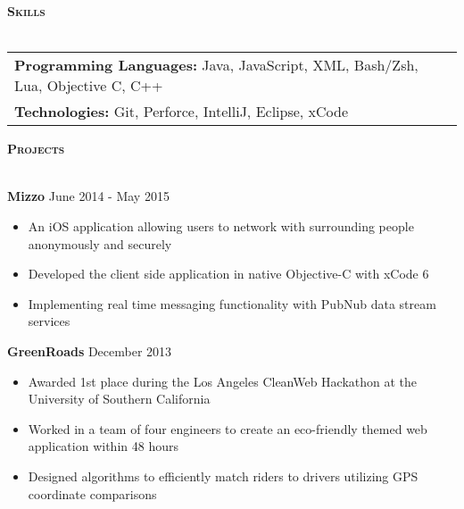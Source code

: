 \documentclass{article}
\newcommand{\lineunder} {
    \vspace*{-8pt} \\
    \hspace*{-18pt} \hrulefill \\
}
\newcommand{\header} [1] {
    {\hspace*{-18pt}\vspace*{6pt} \large{\textbf{\textsc{#1}}}}
    \vspace*{-6pt} \lineunder
}
\begin{document}
\vspace*{2mm}

\header{Skills}
\vspace{1mm}

\begin{tabular}{ l l }
	\textbf{Programming Languages:} Java, JavaScript, XML, Bash/Zsh, Lua, Objective C, C++ \\
	\textbf{Technologies:} Git, Perforce, IntelliJ, Eclipse, xCode \\
\end{tabular}

\vspace*{2mm}

\header{Projects}
\vspace{1mm}

{\textbf{Mizzo} \hfill June 2014 - May 2015}
\begin{itemize} \itemsep -1pt
	\item An iOS application allowing users to network with surrounding people anonymously and securely
	\item Developed the client side application in native Objective-C  with xCode 6
	\item Implementing real time messaging functionality with PubNub data stream services
\end{itemize}

{\textbf{GreenRoads} \hfill December 2013}
\begin{itemize} \itemsep -1pt
	\item Awarded 1st place during the Los Angeles CleanWeb Hackathon at the University of Southern California
	\item Worked in a team of four engineers to create an eco-friendly themed web application within 48 hours
	\item Designed algorithms to efficiently match riders to drivers utilizing GPS coordinate comparisons
\end{itemize}
\end{document}
